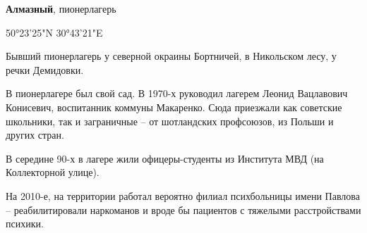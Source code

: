 
\textbf{Алмазный}, пионерлагерь

50°23'25"N 30°43'21"E

Бывший пионерлагерь у северной окраины Бортничей, в Никольском лесу, у речки Демидовки.

В пионерлагере был свой сад. В 1970-х руководил лагерем Леонид Вацлавович Конисевич, воспитанник коммуны Макаренко. Сюда приезжали как советские школьники, так и заграничные – от шотландских профсоюзов, из Польши и других стран.

В середине 90-х в лагере жили офицеры-студенты из Института МВД (на Коллекторной улице).

На 2010-е, на территории работал вероятно филиал психбольницы имени Павлова – реабилитировали наркоманов и вроде бы пациентов с тяжелыми расстройствами психики.
